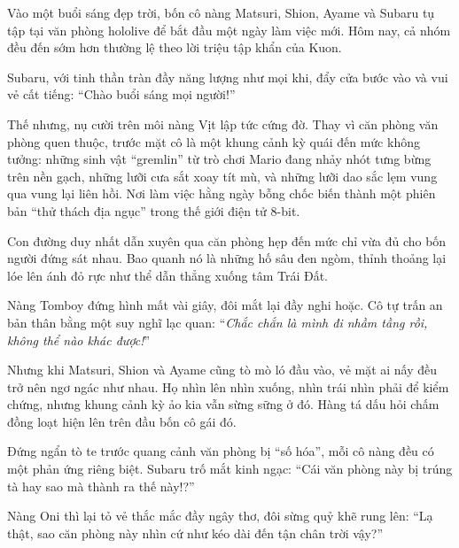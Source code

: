 \documentclass[../main.tex]{subfiles}
\begin{document}

Vào một buổi sáng đẹp trời, bốn cô nàng Matsuri, Shion, Ayame và Subaru tụ tập tại văn phòng hololive để bắt đầu một ngày làm việc mới. Hôm nay, cả nhóm đều đến sớm hơn thường lệ theo lời triệu tập khẩn của Kuon.

Subaru, với tinh thần tràn đầy năng lượng như mọi khi, đẩy cửa bước vào và vui vẻ cất tiếng: ``Chào buổi sáng mọi người!''

Thế nhưng, nụ cười trên môi nàng Vịt lập tức cứng đờ. Thay vì căn phòng văn phòng quen thuộc, trước mặt cô là một khung cảnh kỳ quái đến mức không tưởng: những sinh vật ``gremlin'' từ trò chơi Mario đang nhảy nhót tưng bừng trên nền gạch, những lưỡi cưa sắt xoay tít mù, và những lưỡi dao sắc lẹm vung qua vung lại liên hồi. Nơi làm việc hằng ngày bỗng chốc biến thành một phiên bản ``thử thách địa ngục'' trong thế giới điện tử 8-bit.


Con đường duy nhất dẫn xuyên qua căn phòng hẹp đến mức chỉ vừa đủ cho bốn người đứng sát nhau. Bao quanh nó là những hố sâu đen ngòm, thỉnh thoảng lại lóe lên ánh đỏ rực như thể dẫn thẳng xuống tâm Trái Đất.

Nàng Tomboy đứng hình mất vài giây, đôi mắt lại đầy nghi hoặc. Cô tự trấn an bản thân bằng một suy nghĩ lạc quan: ``\textit{Chắc chắn là mình đi nhầm tầng rồi, không thể nào khác được!}''


Nhưng khi Matsuri, Shion và Ayame cũng tò mò ló đầu vào, vẻ mặt ai nấy đều trở nên ngơ ngác như nhau. Họ nhìn lên nhìn xuống, nhìn trái nhìn phải để kiểm chứng, nhưng khung cảnh kỳ ảo kia vẫn sừng sững ở đó. Hàng tá dấu hỏi chấm đồng loạt hiện lên trên đầu bốn cô gái đó.

Đứng ngẩn tò te trước quang cảnh văn phòng bị ``số hóa'', mỗi cô nàng đều có một phản ứng riêng biệt. Subaru trố mắt kinh ngạc: ``Cái văn phòng này bị trúng tà hay sao mà thành ra thế này!?''

Nàng Oni thì lại tỏ vẻ thắc mắc đầy ngây thơ, đôi sừng quỷ khẽ rung lên: ``Lạ thật, sao căn phòng này nhìn cứ như kéo dài đến tận chân trời vậy?''
\end{document}
